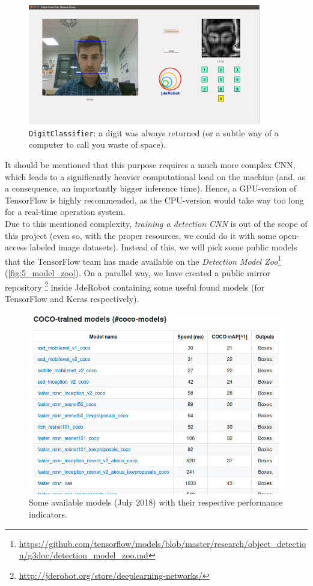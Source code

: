 	\begin{figure}
		\centering
		\includegraphics[width=4in]{images/digitclassifier_not_detection}
		\caption{\texttt{DigitClassifier}: a digit was always returned (or a subtle way of a computer to call you waste of space).}
		\label{fig:5_classifier_not_detecting}
	\end{figure}
	
	
	It should be mentioned that this purpose requires a much more complex CNN, which leads to a significantly heavier computational load on the machine (and, as a consequence, an importantly bigger inference time). Hence, a GPU-version of TensorFlow is highly recommended, as the CPU-version would take way too long for a real-time operation system.\\
	
	Due to this mentioned complexity, \emph{training a detection CNN} is out of the scope of this project (even so, with the proper resources, we could do it with some open-access labeled image datasets). Instead of this, we will pick some public models that the TensorFlow team has made available on the \emph{Detection Model Zoo}\footnote{\url{https://github.com/tensorflow/models/blob/master/research/object_detection/g3doc/detection_model_zoo.md}} (\autoref{fig:5_model_zoo}). On a parallel way, we have created a public mirror repository%
	\footnote{\url{http://jderobot.org/store/deeplearning-networks/}} inside JdeRobot containing some useful found models (for TensorFlow and Keras respectively).\\
	
	\begin{figure}[h]
		\centering
		\includegraphics[width=4.5in]{images/detection_model_zoo}
		\caption{Some available models (July 2018) with their respective performance indicators.}
		\label{fig:5_model_zoo}
	\end{figure}
	
